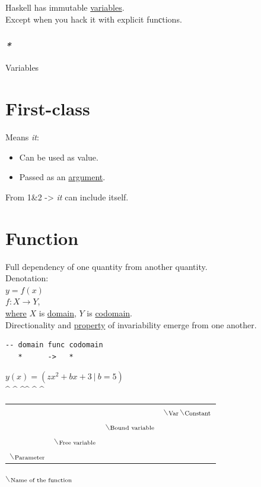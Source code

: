 \documentclass[a4paper,14pt,oneside]{book}
\begin{document}
Haskell has immutable \hyperref[org1f76999]{variables}.\\
Except when you hack it with explicit funсtions.\\

\subsection{\emph{*}}
\label{sec:orgdddbf15}

\label{org1f76999}Variables\\

\chapter{\label{org34ff440}First-class}
\label{sec:org864da2b}
Means \emph{it}:\\
\begin{itemize}
\item Can be used as value.\\
\item Passed as an \hyperref[orgc64e250]{argument}.\\
\end{itemize}
From 1\&2 -> \emph{it} can include itself.\\

\chapter{\label{org39271b2}Function}
\label{sec:org61f4214}
Full dependency of one quantity from another quantity.\\

Denotation:\\
\(y = f(x)\)\\
\(f: X \to Y\),\\
\hyperref[org002404a]{where} \(X\) is \hyperref[org2ec54f8]{domain}, \(Y\) is \hyperref[org716e23e]{codomain}.\\

Directionality and \hyperref[org217f324]{property} of invariability emerge from one another.\\
\begin{verbatim}
-- domain func codomain
   *      ->   *
\end{verbatim}

\(y(x) = (zx^{2} + bx + 3 \ | \ b = 5)\)\\
\^{} \^{}    \^{}\^{}    \^{}   \^{}\\
\begin{center}
\begin{tabular}{llll}
 &  &  & $\backslash$\(\textsubscript{Var}\)$\backslash$\(\textsubscript{Constant}\)\\
 &  & $\backslash$\(\textsubscript{Bound variable}\)\\
 & $\backslash$\(\textsubscript{Free variable}\)\\
$\backslash$\(\textsubscript{Parameter}\)\\
\end{tabular}
\end{center}
$\backslash$\(\textsubscript{Name of the function}\)\\
\end{document}
